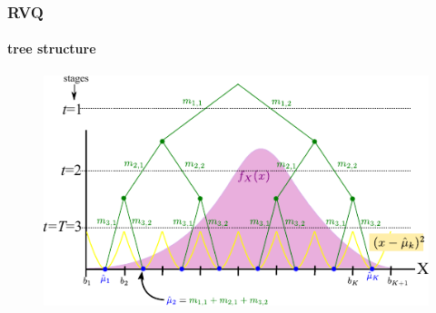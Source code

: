 


\begin{frame}
\frametitle{RVQ}
\framesubtitle{tree structure}
\logoCSIPCPL\mypagenum
	\begin{figure}				
		\includegraphics[width=1.0\textwidth]{thesis/RVQ_graphicalReconstruction.pdf}
	\end{figure}
\end{frame}




